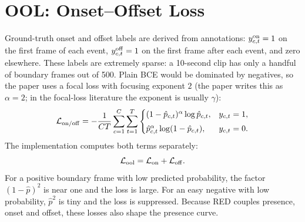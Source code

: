 \section{OOL: Onset--Offset Loss}

Ground-truth onset and offset labels are derived from annotations:
$y^{\mathrm{on}}_{c,t}=1$ on the first frame of each event, $y^{\mathrm{off}}_{c,t}=1$ on the
first frame after each event, and zero elsewhere. These labels are extremely
sparse: a 10-second clip has only a handful of boundary frames out of 500.
Plain BCE would be dominated by negatives, so the paper uses a focal loss with
focusing exponent $2$ (the paper writes this as $\alpha=2$; in the focal-loss
literature the exponent is usually $\gamma$):
\begin{equation}
\mathcal{L}_{\mathrm{on}/\mathrm{off}}
=
-\frac{1}{CT}
\sum_{c=1}^{C}\sum_{t=1}^{T}
\begin{cases}
(1-\hat p_{c,t})^{\alpha}\log \hat p_{c,t}, & y_{c,t}=1,\\[3pt]
\hat p_{c,t}^{\alpha}\log(1-\hat p_{c,t}), & y_{c,t}=0.
\end{cases}
\end{equation}
The implementation computes both terms separately:
\begin{equation}
\mathcal{L}_{\mathrm{ool}}
=
\mathcal{L}_{\mathrm{on}}+\mathcal{L}_{\mathrm{off}}.
\end{equation}
For a positive boundary frame with low predicted probability, the factor
$(1-\hat p)^2$ is near one and the loss is large. For an easy negative with low
probability, $\hat p^2$ is tiny and the loss is suppressed. Because RED couples
presence, onset and offset, these losses also shape the presence curve.
